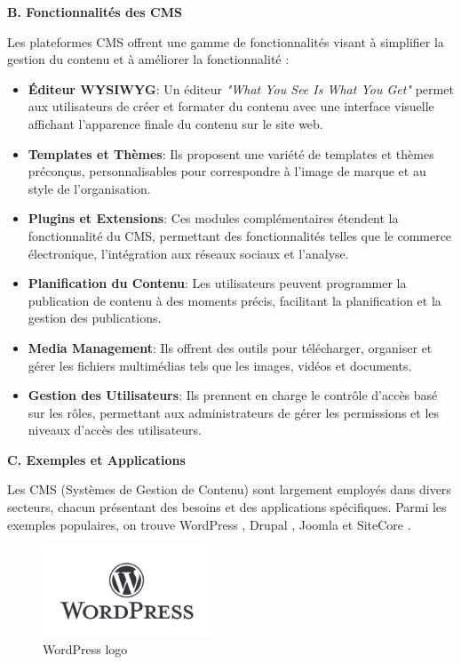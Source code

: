 \textbf{B. Fonctionnalités des CMS}


Les plateformes CMS offrent une gamme de fonctionnalités visant à simplifier la gestion du contenu et à améliorer la fonctionnalité :


\begin{itemize}
    \item \textbf{Éditeur WYSIWYG}: Un éditeur \textit{"What You See Is What You Get"} permet aux utilisateurs de créer et formater du contenu avec une interface visuelle affichant l'apparence finale du contenu sur le site web.

    \item \textbf{Templates et Thèmes}: Ils proposent une variété de templates et thèmes préconçus, personnalisables pour correspondre à l'image de marque et au style de l'organisation.

    \item \textbf{Plugins et Extensions}: Ces modules complémentaires étendent la fonctionnalité du CMS, permettant des fonctionnalités telles que le commerce électronique, l'intégration aux réseaux sociaux et l'analyse.

    \item \textbf{Planification du Contenu}: Les utilisateurs peuvent programmer la publication de contenu à des moments précis, facilitant la planification et la gestion des publications.
    \item \textbf{Media Management}: Ils offrent des outils pour télécharger, organiser et gérer les fichiers multimédias tels que les images, vidéos et documents.

    \item \textbf{Gestion des Utilisateurs}: Ils prennent en charge le contrôle d'accès basé sur les rôles, permettant aux administrateurs de gérer les permissions et les niveaux d'accès des utilisateurs.
\end{itemize}

\textbf{C. Exemples et Applications}

Les CMS (Systèmes de Gestion de Contenu) sont largement employés dans divers secteurs, chacun présentant des besoins et des applications spécifiques. Parmi les exemples populaires, on trouve WordPress \cite{ref3}, Drupal \cite{ref4}, Joomla \cite{ref5} et SiteCore \cite{ref6}.
\begin{figure}[H]
    \centering
    \includegraphics[width=5cm]{Figures/WordPress.png}
    \caption{WordPress logo}
\end{figure}

